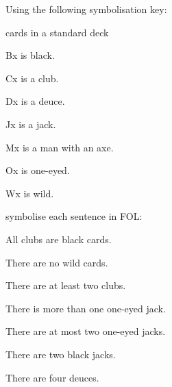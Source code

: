 \problempart
\label{pr.FOLcards}
Using the following symbolisation key:
\begin{ekey}
\item[\text{domain}] cards in a standard deck
\item[Bx]  is black.
\item[Cx]  is a club.
\item[Dx]  is a deuce.
\item[Jx]  is a jack.
\item[Mx]  is a man with an axe.
\item[Ox]  is one-eyed.
\item[Wx]  is wild.
\end{ekey}
symbolise each sentence in FOL:
\begin{earg}
\item All clubs are black cards.
\item[] 
\item There are no wild cards.
\item[] 
\item There are at least two clubs.
\item[] 
\item There is more than one one-eyed jack.
\item[] 
\item There are at most two one-eyed jacks.
\item[] 
\item There are two black jacks.
\item[] 
\item There are four deuces.
\item[] 
\end{earg}

